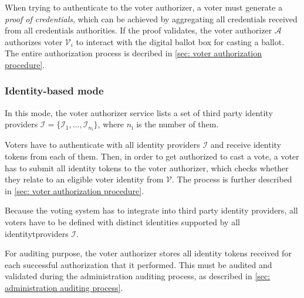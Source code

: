 When trying to authenticate to the voter authorizer, a voter must generate a \textit{proof of credentials}, which can be achieved by aggregating all credentials received from all credentials authorities. If the proof validates, the voter authorizer $\mathcal{A}$ authorizes voter $\mathcal{V}_i$ to interact with the digital ballot box for casting a ballot. The entire authorization process is decribed in \cref{sec: voter authorization procedure}.


\subsubsection{Identity-based mode} \label{sec: identity-based mode}
In this mode, the voter authorizer service lists a set of third party identity providers $\boldsymbol{\mathcal{I}} = \{ \mathcal{I}_1, ..., \mathcal{I}_{n_\mathrm{i}} \}$, where $n_\mathrm{i}$ is the number of them.

Voters have to authenticate with all identity providers $\boldsymbol{\mathcal{I}}$ and receive identity tokens from each of them. Then, in order to get authorized to cast a vote, a voter has to submit all identity tokens to the voter authorizer, which checks whether they relate to an eligible voter identity from $\boldsymbol{\mathcal{V}}$. The process is further described in \cref{sec: voter authorization procedure}.

Because the voting system has to integrate into third party identity providers, all voters have to be defined with distinct identities supported by all identitytproviders $\boldsymbol{\mathcal{I}}$.

For auditing purpose, the voter authorizer stores all identity tokens received for each successful authorization that it performed. This must be audited and validated during the administration auditing process, as described in \cref{sec: administration auditing process}.
